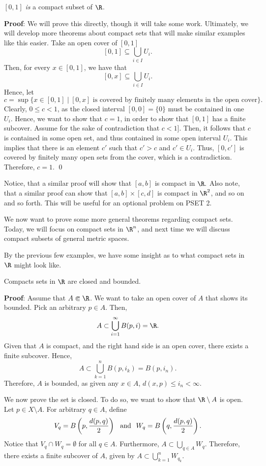 \begin{example}
$[0,1]$ \textit{is} a compact subset of $\R$.
\end{example}

\textbf{Proof}: We will prove this directly, though it will take some work. Ultimately, we will develop more theorems about compact sets that will make similar examples like this easier. Take an open cover of $[0,1]$
\[
[0,1] \subseteq \bigcup_{i\in I} U_i.
\]
Then, for every $x\in [0,1]$, we have that 
\[
[0,x] \subseteq \bigcup_{i\in I} U_i.
\]
Hence, let
\[
c = \sup \{x\in [0,1] \mid [0,x] \text{~is covered by finitely many elements in the open cover}\}.
\]
Clearly, $0\leq c < 1$, as the closed interval $[0,0] = \{0\}$ must be contained in one $U_i$. Hence, we want to show that $c = 1$, in order to show that $[0,1]$ has a finite subcover. Assume for the sake of contradiction that $c< 1].$ Then, it follows that $c$ is contained in some open set, and thus contained in some open interval $U_i$. This implies that there is an element $c'$ such that $c'>c$ and $c'\in U_i$. Thus, $[0,c']$ is covered by finitely many open sets from the cover, which is a contradiction. Therefore, $c = 1$. \qed 

\begin{remark}
Notice, that a similar proof will show that $[a,b]$ is compact in $\R.$ Also note, that a similar proof can show that $[a,b]\times [c,d]$ is compact in $\R^2$, and so on and so forth. This will be useful for an optional problem on PSET 2.
\end{remark}

We now want to prove some more general theorems regarding compact sets. Today, we will focus on compact sets in $\R^n$, and next time we will discuss compact subsets of general metric spaces.

By the previous few examples, we have some insight as to what compact sets in $\R$ might look like. 
\begin{theorem}
Compacts sets in $\R$ are closed and bounded.
\end{theorem}
\textbf{Proof}: Assume that $A\Subset \R$. We want to take an open cover of $A$ that shows its bounded. Pick an arbitrary $p\in A$. Then, 
\[
A \subset \bigcup_{i=1}^\infty B(p,i) = \R.
\]
Given that $A$ is compact, and the right hand side is an open cover, there exists a finite subcover. Hence, 
\[
A \subset \bigcup_{k=1}^n B(p,i_k) = B(p, i_n).
\]
Therefore, $A$ is bounded, as given any $x\in A$, $d(x,p) \leq i_n <\infty$. 

We now prove the set is closed. To do so, we want to show that $\R \setminus A$ is open. Let $p\in X\setminus A$. For arbitrary $q\in A$, define 
\[
V_q = B\left(p,\frac{d(p,q)}{2}\right) \hspace{.25cm}\text{and} \hspace{.25cm } W_q = B\left(q,\frac{d(p,q)}{2}\right).
\]
Notice that $V_q \cap W_q = \emptyset$ for all $q\in A$. Furthermore,
$A \subset \bigcup_{q\in A} W_q.$
Therefore, there exists a finite subcover of $A$, given by 
$A\subset \bigcup_{k=1}^n W_{q_k}.$

